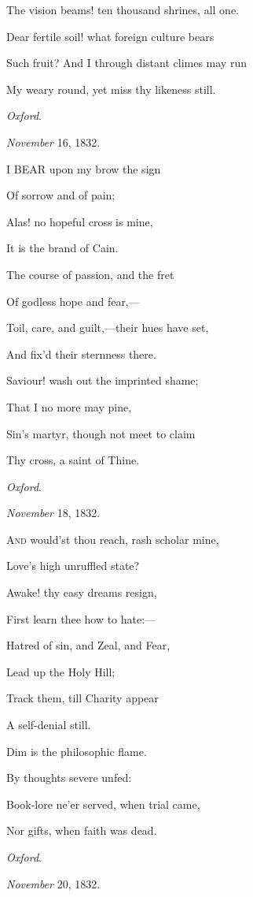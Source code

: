 The vision beams! ten thousand shrines, all one.

Dear fertile soil! what foreign culture bears

Such fruit? And I through distant climes may run

My weary round, yet miss thy likeness still.

\emph{Oxford}.

\emph{November} 16, 1832.


I BEAR upon my brow the sign

Of sorrow and of pain;

Alas! no hopeful cross is mine,

It is the brand of Cain.

The course of passion, and the fret

Of godless hope and fear,—

Toil, care, and guilt,—their hues have set,

And fix'd their sternness there.

Saviour! wash out the imprinted shame;

That I no more may pine,

Sin's martyr, though not meet to claim

Thy cross, a saint of Thine.

\emph{Oxford}.

\emph{November} 18, 1832.


A\textsc{nd} would'st thou reach, rash scholar mine,

Love's high unruffled state?

Awake! thy easy dreams resign,

First learn thee how to hate:—

Hatred of sin, and Zeal, and Fear,

Lead up the Holy Hill;

Track them, till Charity appear

A self-denial still.

Dim is the philosophic flame.

By thoughts severe unfed:

Book-lore ne'er served, when trial came,

Nor gifts, when faith was dead.

\emph{Oxford}.

\emph{November} 20, 1832.

